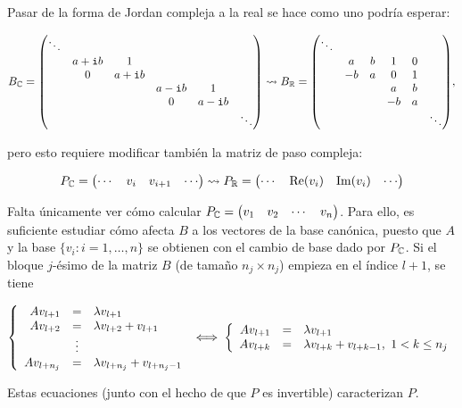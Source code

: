 \documentclass[../ecuaciones_diferenciales.tex]{subfiles}
\begin{document}
Pasar de la forma de Jordan compleja a la real se hace como uno podría
esperar:

\[B_\Complex =
	\mat{\ddots &      &      &      &      &         \\
		& a + \iu b & 1    &      &      &         \\
		& 0    & a + \iu b &      &      &         \\
		&      &      & a - \iu b & 1    &         \\
		&      &      & 0    & a - \iu b &         \\
		&      &      &      &      & \ddots} \leadsto
	B_\R =
	\mat{\ddots &    &   &    &      &         \\
		& a  & b & 1  & 0 &         \\
		& -b & a & 0  & 1 &         \\
		&    &   & a  & b &         \\
		&    &   & -b & a &         \\
		&    &   &    &   & \ddots},
\]

pero esto requiere modificar también la matriz de paso compleja:

\[P_{\mathbb{C}} =
	\begin{pmatrix}\cdots & v_i & v_{i+1} & \cdots\end{pmatrix} \leadsto
	P_{\mathbb{R}} =
	\begin{pmatrix}\cdots & \mathrm{Re}(v_i) & \mathrm{Im}(v_i) & \cdots\end{pmatrix}\]

Falta únicamente ver cómo calcular
\(P_{\mathbb{C}} = \begin{pmatrix}v_1 & v_2 & \cdots & v_n\end{pmatrix}\). Para ello, es suficiente
estudiar cómo afecta \(B\) a los vectores de la base canónica, puesto que
\(A\) y la base \(\{v_i : i = 1, \dots, n\}\) se obtienen con el cambio de
base dado por \(P_{\mathbb{C}}\). Si el bloque \(j\)-ésimo de la matriz \(B\) (de
tamaño \(n_j \times n_j\)) empieza en el índice \(l+1\), se tiene

\[\left\{
	\begin{array}[ht]{r c l}
		Av_{l+1}    & =      & \lambda v_{l+1}                 \\
		Av_{l+2}    & =      & \lambda v_{l+2} + v_{l+1}       \\
		            & \vdots &                                 \\
		A v_{l+n_j} & =      & \lambda v_{l+n_j} + v_{l+n_j-1}
	\end{array} \right. \iff
	\left\{
	\begin{array}[ht]{r c l}
		Av_{l+1} & = & \lambda v_{l+1}                               \\
		Av_{l+k} & = & \lambda v_{l+k} + v_{l+k-1}, \ 1 < k \leq n_j \\
	\end{array}
	\right.\]

Estas ecuaciones (junto con el hecho de que \(P\) es invertible)
caracterizan \(P\).
\end{document}
